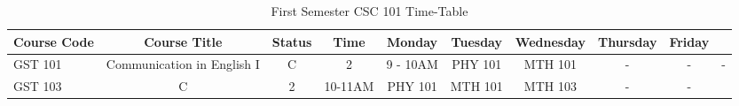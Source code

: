 \documentclass{article}
\begin{document}
	
		\begin{sidewaystable}[h!] 
			\begin{center}
				\caption{First Semester CSC 101 Time-Table}
				\label{tab:table1}
				\begin{tabular}{l|S|c|c|c|c|c|c|c|c|}
					\textbf{Course Code} &\textbf{Course Title} & \textbf{Status} & \textbf{Time} & \textbf{Monday} & \textbf{Tuesday} & \textbf{Wednesday} & \textbf{Thursday} & \textbf{Friday}\\
					\hline
			GST 101 & Communication in English I & C & 2 & 9 - 10AM & PHY 101 & MTH 101 & - & - & - \\
			GST 103 & C & 2 & 10-11AM & PHY 101 & MTH 101 & MTH 103 & - & -\\
				
					\end{tabular}
				\end{center} 
			\end{sidewaystable}
		
		
\end{document}
